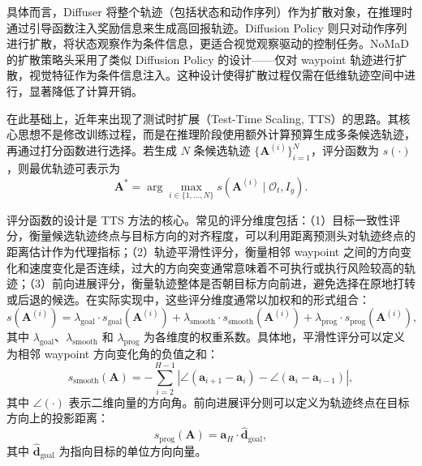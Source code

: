 具体而言，Diffuser\cite{diffuser2022} 将整个轨迹（包括状态和动作序列）作为扩散对象，在推理时通过引导函数注入奖励信息来生成高回报轨迹。Diffusion Policy\cite{diffusionpolicy2023} 则只对动作序列进行扩散，将状态观察作为条件信息，更适合视觉观察驱动的控制任务。NoMaD 的扩散策略头采用了类似 Diffusion Policy 的设计——仅对 waypoint 轨迹进行扩散，视觉特征作为条件信息注入。这种设计使得扩散过程仅需在低维轨迹空间中进行，显著降低了计算开销。

在此基础上，近年来出现了测试时扩展（Test-Time Scaling, TTS）的思路\cite{ttsdiffusion2025,ttssearch2025}。其核心思想不是修改训练过程，而是在推理阶段使用额外计算预算生成多条候选轨迹，再通过打分函数进行选择。若生成 $N$ 条候选轨迹 $\{\mathbf{A}^{(i)}\}_{i=1}^N$，评分函数为 $s(\cdot)$，则最优轨迹可表示为
\begin{equation}
\mathbf{A}^{\ast} = \arg\max_{i\in\{1,\ldots,N\}} s\!\left(\mathbf{A}^{(i)} \mid \mathcal{O}_t, I_g\right).
\end{equation}

评分函数的设计是 TTS 方法的核心。常见的评分维度包括：（1）目标一致性评分，衡量候选轨迹终点与目标方向的对齐程度，可以利用距离预测头对轨迹终点的距离估计作为代理指标；（2）轨迹平滑性评分，衡量相邻 waypoint 之间的方向变化和速度变化是否连续，过大的方向突变通常意味着不可执行或执行风险较高的轨迹；（3）前向进展评分，衡量轨迹整体是否朝目标方向前进，避免选择在原地打转或后退的候选。在实际实现中，这些评分维度通常以加权和的形式组合：
\begin{equation}
s(\mathbf{A}^{(i)}) = \lambda_{\text{goal}} \cdot s_{\text{goal}}(\mathbf{A}^{(i)}) + \lambda_{\text{smooth}} \cdot s_{\text{smooth}}(\mathbf{A}^{(i)}) + \lambda_{\text{prog}} \cdot s_{\text{prog}}(\mathbf{A}^{(i)}),
\end{equation}
其中 $\lambda_{\text{goal}}$、$\lambda_{\text{smooth}}$ 和 $\lambda_{\text{prog}}$ 为各维度的权重系数。具体地，平滑性评分可以定义为相邻 waypoint 方向变化角的负值之和：
\begin{equation}
s_{\text{smooth}}(\mathbf{A}) = -\sum_{i=2}^{H-1} \left|\angle(\mathbf{a}_{i+1} - \mathbf{a}_i) - \angle(\mathbf{a}_i - \mathbf{a}_{i-1})\right|,
\end{equation}
其中 $\angle(\cdot)$ 表示二维向量的方向角。前向进展评分则可以定义为轨迹终点在目标方向上的投影距离：
\begin{equation}
s_{\text{prog}}(\mathbf{A}) = \mathbf{a}_H \cdot \hat{\mathbf{d}}_{\text{goal}},
\end{equation}
其中 $\hat{\mathbf{d}}_{\text{goal}}$ 为指向目标的单位方向向量。

